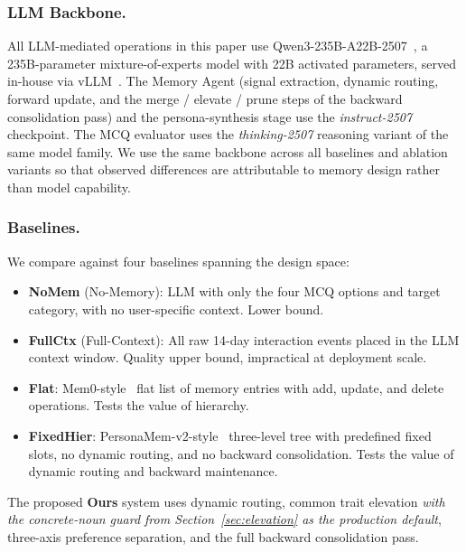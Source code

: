 \documentclass[sigconf,review,anonymous]{acmart}
\begin{document}
\subsubsection{LLM Backbone.}
All LLM-mediated operations in this paper use Qwen3-235B-A22B-2507~\cite{qwen3}, a 235B-parameter mixture-of-experts model with 22B activated parameters, served in-house via vLLM~\cite{vllm}. The Memory Agent (signal extraction, dynamic routing, forward update, and the merge / elevate / prune steps of the backward consolidation pass) and the persona-synthesis stage use the \emph{instruct-2507} checkpoint. The MCQ evaluator uses the \emph{thinking-2507} reasoning variant of the same model family. We use the same backbone across all baselines and ablation variants so that observed differences are attributable to memory design rather than model capability.

\subsubsection{Baselines.}
We compare against four baselines spanning the design space:
\begin{itemize}
    \item \textbf{NoMem} (No-Memory): LLM with only the four MCQ options and target category, with no user-specific context. Lower bound.
    \item \textbf{FullCtx} (Full-Context): All raw 14-day interaction events placed in the LLM context window. Quality upper bound, impractical at deployment scale.
    \item \textbf{Flat}: Mem0-style~\cite{mem0} flat list of memory entries with add, update, and delete operations. Tests the value of hierarchy.
    \item \textbf{FixedHier}: PersonaMem-v2-style~\cite{personamem-v2} three-level tree with predefined fixed slots, no dynamic routing, and no backward consolidation. Tests the value of dynamic routing and backward maintenance.
\end{itemize}
The proposed \textbf{Ours} system uses dynamic routing, common trait elevation \emph{with the concrete-noun guard from Section~\ref{sec:elevation} as the production default}, three-axis preference separation, and the full backward consolidation pass.
\end{document}
